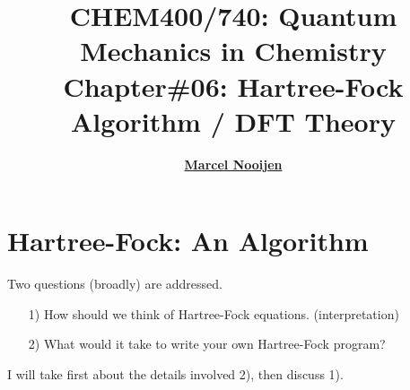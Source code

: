 \documentclass[a4paper, 12pt]{article}
\begin{document}
\title{\bf {CHEM400/740: Quantum Mechanics in Chemistry\\ Chapter\#06: Hartree-Fock Algorithm / DFT Theory}} \author{\bf
  \href{http://scienide2.uwaterloo.ca/~nooijen/website_new_20_10_2011/About.html}{Marcel Nooijen}} \date{}
  
\pagestyle{fancy} \fancyhead[L]{\textcolor{PrimaryColor}{CHEM400/740: Quantum Mechanics in Chemistry}} \fancyhead[R]{\textcolor{PrimaryColor}{2021 Winter}}


\maketitle
\tableofcontents

\clearpage


\section{Hartree-Fock: An Algorithm}

Two questions (broadly) are addressed.
\begin{itemize}
	\item [1)] How should we think of Hartree-Fock equations. (interpretation)
	\item [2)] What would it take to write your own Hartree-Fock program? 
\end{itemize}
\tab I will take first about the details involved 2), then discuss 1).
\end{document}
